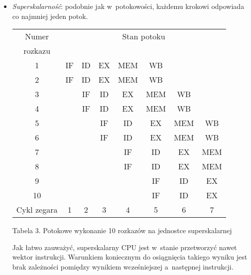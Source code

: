\documentclass{mwart}
\begin{document}
	\begin{itemize}
	\item \emph{Superskalarność}: podobnie jak w~potokowości, każdemu krokowi odpowiada co najmniej jeden potok.

	\begin{center}
	\begin{tabular}{|c|c|c|c|c|c|c|c|} \hline
	Numer 		 & \multicolumn{7}{c|}{Stan potoku} \\
	rozkazu & \multicolumn{7}{c|}{} \\ \hline
	1 & IF & ID & EX & \cellcolor{yellow} MEM & WB & & \\ \hline
	2 & IF & ID & EX & \cellcolor{yellow} MEM & WB & & \\ \hline
	3 & & IF & ID & \cellcolor{yellow} EX & MEM & WB & \\ \hline
	4 & & IF & ID & \cellcolor{yellow} EX & MEM & WB & \\ \hline
	5 & & & IF & \cellcolor{yellow} ID & EX & MEM & WB \\ \hline
	6 & & & IF & \cellcolor{yellow} ID & EX & MEM & WB \\ \hline
	7 & & & & \cellcolor{yellow} IF & ID & EX & MEM \\ \hline
	8 & & & & \cellcolor{yellow} IF & ID & EX & MEM \\ \hline
	9 & & & & \cellcolor{yellow} & IF & ID & EX \\ \hline \hline
	10 & & & & \cellcolor{yellow} & IF & ID & EX \\ \hline \hline
	Cykl zegara & 1 & 2 & 3 & \cellcolor{yellow} 4 & 5 & 6 & 7 \\ \hline
	\end{tabular}\par
	\begin{small} Tabela 3. Potokowe wykonanie 10 rozkazów na jednostce superskalarnej\end{small}
	\end{center}
	Jak łatwo zauważyć, superskalarny CPU jest w~stanie przetworzyć nawet wektor instrukcji. Warunkiem koniecznym do osiągnięcia takiego
	wyniku jest brak zależności pomiędzy wynikiem wcześniejszej a~następnej instrukcji.


\end{itemize}
\end{document}
